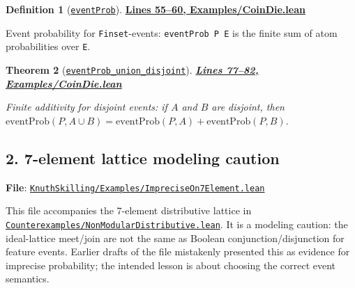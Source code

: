 \documentclass[11pt]{article}
\newtheorem{theorem}{Theorem}[section]
\theoremstyle{definition}
\newtheorem{definition}[theorem]{Definition}
\theoremstyle{remark}
\begin{document}
\begin{definition}[\href{https://github.com/zariuq/ks-foundations-of-inference/blob/main/KnuthSkilling/Examples/CoinDie.lean\#L59}{\texttt{eventProb}}]
\textbf{\href{https://github.com/zariuq/ks-foundations-of-inference/blob/main/KnuthSkilling/Examples/CoinDie.lean\#L55-L60}{Lines 55--60, Examples/CoinDie.lean}}

Event probability for \texttt{Finset}-events: \texttt{eventProb P E} is the finite sum of atom
probabilities over \texttt{E}.
\end{definition}

\begin{theorem}[\href{https://github.com/zariuq/ks-foundations-of-inference/blob/main/KnuthSkilling/Examples/CoinDie.lean\#L78}{\texttt{eventProb\_union\_disjoint}}]
\textbf{\href{https://github.com/zariuq/ks-foundations-of-inference/blob/main/KnuthSkilling/Examples/CoinDie.lean\#L77-L82}{Lines 77--82, Examples/CoinDie.lean}}

Finite additivity for disjoint events: if $A$ and $B$ are disjoint, then
$\mathrm{eventProb}(P, A \cup B)=\mathrm{eventProb}(P, A)+\mathrm{eventProb}(P, B)$.
\end{theorem}



\subsection*{2. 7-element lattice modeling caution}

\textbf{File}: \href{https://github.com/zariuq/ks-foundations-of-inference/blob/main/KnuthSkilling/Examples/ImpreciseOn7Element.lean}{\texttt{KnuthSkilling/Examples/ImpreciseOn7Element.lean}}

This file accompanies the 7-element distributive lattice in
\href{https://github.com/zariuq/ks-foundations-of-inference/blob/main/KnuthSkilling/Counterexamples/NonModularDistributive.lean}{\texttt{Counterexamples/NonModularDistributive.lean}}.  It is a modeling caution: the ideal-lattice
meet/join are not the same as Boolean conjunction/disjunction for feature events.  Earlier drafts of
the file mistakenly presented this as evidence for imprecise probability; the intended lesson is
about choosing the correct event semantics.
\end{document}
